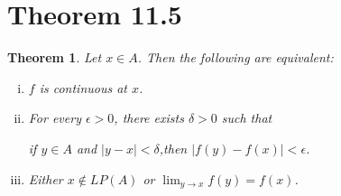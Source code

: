 \documentclass[openany, amssymb, psamsfonts]{amsart}
\newcommand{\abs}[1]{\lvert #1 \rvert}
\newtheorem{thm}{Theorem}[section]
\theoremstyle{definition}
\numberwithin{equation}{section}
\begin{document}
\section*{Theorem 11.5}
\begin{thm}
\label{11.5}
	Let $x\in A$. Then the following are equivalent:
	\begin{enumerate}[(i)]
		\item $f$ is continuous at $x$.
		\item For every $\epsilon > 0$, there exists $\delta > 0$ such that 
		\begin{center}
			if $y \in A$ and $\abs{y - x} < \delta$,\qquad then $\abs{f(y) - f(x)} < \epsilon$.
		\end{center}
		\item Either $x \notin LP(A)$ or $\displaystyle \lim_{y \to x} f(y) = f(x)$.
	\end{enumerate}
\end{thm}
\end{document}
